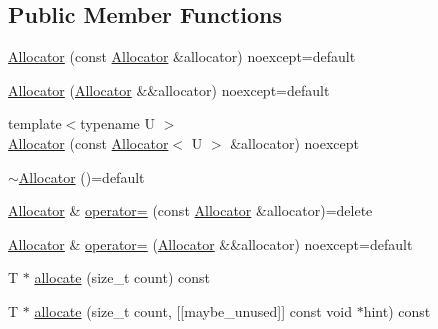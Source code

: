 \subsection*{Public Member Functions}
\begin{DoxyCompactItemize}
\item 
\mbox{\hyperlink{classmage_1_1_single_ended_memory_stack_1_1_allocator_abcbc435ff81182693d19aef11e6b4983}{Allocator}} (const \mbox{\hyperlink{classmage_1_1_single_ended_memory_stack_1_1_allocator}{Allocator}} \&allocator) noexcept=default
\item 
\mbox{\hyperlink{classmage_1_1_single_ended_memory_stack_1_1_allocator_a7d913b8b1a6b56a1f2dc06aba91e929c}{Allocator}} (\mbox{\hyperlink{classmage_1_1_single_ended_memory_stack_1_1_allocator}{Allocator}} \&\&allocator) noexcept=default
\item 
{\footnotesize template$<$typename U $>$ }\\\mbox{\hyperlink{classmage_1_1_single_ended_memory_stack_1_1_allocator_a6fd265441059b0d5bd6defbaaf5b1368}{Allocator}} (const \mbox{\hyperlink{classmage_1_1_single_ended_memory_stack_1_1_allocator}{Allocator}}$<$ U $>$ \&allocator) noexcept
\item 
\mbox{\hyperlink{classmage_1_1_single_ended_memory_stack_1_1_allocator_a529274874ef0d44bf9ffcb18c6f20f0b}{$\sim$\+Allocator}} ()=default
\item 
\mbox{\hyperlink{classmage_1_1_single_ended_memory_stack_1_1_allocator}{Allocator}} \& \mbox{\hyperlink{classmage_1_1_single_ended_memory_stack_1_1_allocator_aa124f846e082080f12330255ffb3d360}{operator=}} (const \mbox{\hyperlink{classmage_1_1_single_ended_memory_stack_1_1_allocator}{Allocator}} \&allocator)=delete
\item 
\mbox{\hyperlink{classmage_1_1_single_ended_memory_stack_1_1_allocator}{Allocator}} \& \mbox{\hyperlink{classmage_1_1_single_ended_memory_stack_1_1_allocator_a0d5de467c96969b4c0d645bdc7b398db}{operator=}} (\mbox{\hyperlink{classmage_1_1_single_ended_memory_stack_1_1_allocator}{Allocator}} \&\&allocator) noexcept=default
\item 
T $\ast$ \mbox{\hyperlink{classmage_1_1_single_ended_memory_stack_1_1_allocator_afda7a44c3f17c9d41a6fe9f645fdc6a1}{allocate}} (size\+\_\+t count) const
\item 
T $\ast$ \mbox{\hyperlink{classmage_1_1_single_ended_memory_stack_1_1_allocator_ad7ace2215dcaacf633ae3bbe479cd2fc}{allocate}} (size\+\_\+t count, \mbox{[}\mbox{[}maybe\+\_\+unused\mbox{]}\mbox{]} const void $\ast$hint) const
\item 

\end{DoxyCompactItemize}
